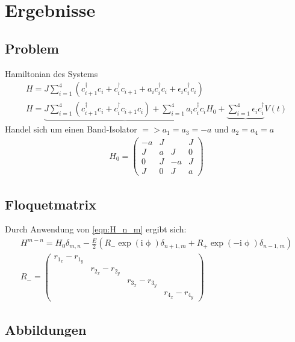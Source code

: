 \chapter{Ergebnisse}
\section{Problem}
Hamiltonian des Systems
\begin{align}
  H=J\sum_{i=1}^4 \left(c_{i+1}^\dag c_i + c_{i}^\dag c_{i+1}   +a_i c_i^\dag c_i +\epsilon_i c_i^\dag c_i\right)\\
  H=\underbrace{J\sum_{i=1}^4 \left(c_{i+1}^\dag c_i + c_{i}^\dag c_{i+1}c_i\right)   +\sum_{i=1}^4a_i c_i^\dag c_i}{H_0} +\underbrace{\sum_{i=1}^4\epsilon_i c_i^\dag}{V(t)}
\end{align}
Handel sich um einen Band-Isolator $=> a_1=a_3=-a$ und  $a_2=a_4=a$
\begin{align}
  H_0=\begin{pmatrix}
  -a& J& & J \\
  J& a &J & 0\\
  0& J& -a& J \\
  J& 0&  J & a
\end{pmatrix}
\end{align}


\section{Floquetmatrix}
Durch Anwendung von \eqref{eqn:H_n_m} ergibt sich:
\begin{align}
  H^{m-n}=H_0\delta_{m,n} -\frac{E}{2}\left(R_{-} \exp\left( \mathrm{i}\upphi\right)\delta_{n+1,m}   +  R_{+}\exp\left( -\mathrm{i}\upphi\right)\delta_{n-1,m}\right)\\
  R_{-}=
\begin{pmatrix}
  r_{1_x}-r_{1_y}& & & \\
  &r_{2_x}-r_{2_y} & & \\
  & & r_{3_x}-r_{3_y}& \\
  & & & r_{4_x}-r_{4_y}
\end{pmatrix}
\end{align}




\section{Abbildungen}
